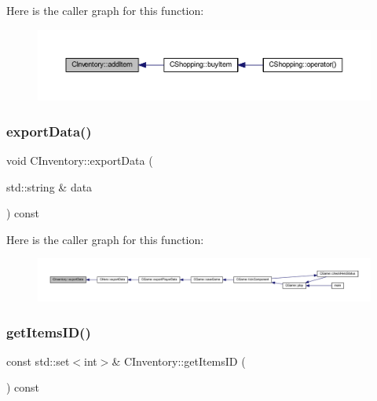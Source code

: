 Here is the caller graph for this function\+:\nopagebreak
\begin{figure}[H]
\begin{center}
\leavevmode
\includegraphics[width=350pt]{class_c_inventory_aee94ee18f40ea685f640a15f8f6f75b9_icgraph}
\end{center}
\end{figure}
\mbox{\label{class_c_inventory_aaf1332bfb30866845bbcae69e411e4bc}} 
\subsubsection{\texorpdfstring{export\+Data()}{exportData()}}
{\footnotesize\ttfamily void C\+Inventory\+::export\+Data (\begin{DoxyParamCaption}\item[{std\+::string \&}]{data }\end{DoxyParamCaption}) const}

Here is the caller graph for this function\+:\nopagebreak
\begin{figure}[H]
\begin{center}
\leavevmode
\includegraphics[width=350pt]{class_c_inventory_aaf1332bfb30866845bbcae69e411e4bc_icgraph}
\end{center}
\end{figure}
\mbox{\label{class_c_inventory_a473699b2949d4c6c19853f5047fa7737}} 
\subsubsection{\texorpdfstring{get\+Items\+I\+D()}{getItemsID()}}
{\footnotesize\ttfamily const std\+::set$<$int$>$\& C\+Inventory\+::get\+Items\+ID (\begin{DoxyParamCaption}{ }\end{DoxyParamCaption}) const\hspace{0.3cm}{\ttfamily [inline]}}

